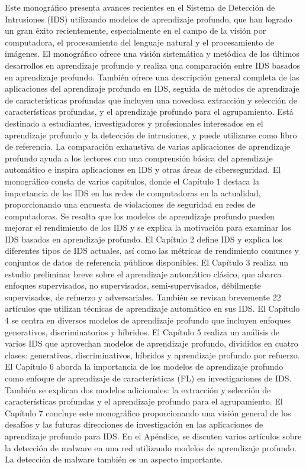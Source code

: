 \documentclass[11pt, a4paper]{article} %
\begin{document}
Este monográfico presenta avances recientes en el Sistema de Detección de Intrusiones (IDS) utilizando modelos de aprendizaje profundo, que han logrado un gran éxito recientemente, especialmente en el campo de la visión por computadora, el procesamiento del lenguaje natural y el procesamiento de imágenes. El monográfico ofrece una visión sistemática y metódica de los últimos desarrollos en aprendizaje profundo y realiza una comparación entre IDS basados en aprendizaje profundo. También ofrece una descripción general completa de las aplicaciones del aprendizaje profundo en IDS, seguida de métodos de aprendizaje de características profundas que incluyen una novedosa extracción y selección de características profundas, y el aprendizaje profundo para el agrupamiento.
Está destinado a estudiantes, investigadores y profesionales interesados en el aprendizaje profundo y la detección de intrusiones, y puede utilizarse como libro de referencia. La comparación exhaustiva de varias aplicaciones de aprendizaje profundo ayuda a los lectores con una comprensión básica del aprendizaje automático e inspira aplicaciones en IDS y otras áreas de ciberseguridad.
El monográfico consta de varios capítulos, donde el Capítulo 1 destaca la importancia de los IDS en las redes de computadoras en la actualidad, proporcionando una encuesta de violaciones de seguridad en redes de computadoras. Se resalta que los modelos de aprendizaje profundo pueden mejorar el rendimiento de los IDS y se explica la motivación para examinar los IDS basados en aprendizaje profundo. El Capítulo 2 define IDS y explica los diferentes tipos de IDS actuales, así como las métricas de rendimiento comunes y conjuntos de datos de referencia públicos disponibles.
El Capítulo 3 realiza un estudio preliminar breve sobre el aprendizaje automático clásico, que abarca enfoques supervisados, no supervisados, semi-supervisados, débilmente supervisados, de refuerzo y adversariales. También se revisan brevemente 22 artículos que utilizan técnicas de aprendizaje automático en sus IDS. El Capítulo 4 se centra en diversos modelos de aprendizaje profundo que incluyen enfoques generativos, discriminatorios y híbridos.
El Capítulo 5 realiza un análisis de varios IDS que aprovechan modelos de aprendizaje profundo, divididos en cuatro clases: generativos, discriminativos, híbridos y aprendizaje profundo por refuerzo.
El Capítulo 6 aborda la importancia de los modelos de aprendizaje profundo como enfoque de aprendizaje de características (FL) en investigaciones de IDS. También se explican dos modelos adicionales: la extracción y selección de características profundas y el aprendizaje profundo para el agrupamiento.
El Capítulo 7 concluye este monográfico proporcionando una visión general de los desafíos y las futuras direcciones de investigación en las aplicaciones de aprendizaje profundo para IDS.
En el Apéndice, se discuten varios artículos sobre la detección de malware en una red utilizando modelos de aprendizaje profundo. La detección de malware también es un aspecto importante.
\end{document}
